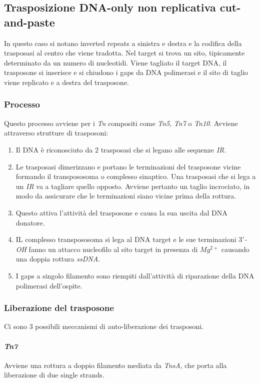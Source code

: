	\subsection{Trasposizione DNA-only non replicativa cut-and-paste}
	In questo caso si notano inverted repeats a sinistra e destra e la codifica della trasposasi al centro che viene tradotta.
	Nel target si trova un sito, tipicamente determinato da un numero di nucleotidi. 
	Viene tagliato il target DNA, il trasposone si inserisce e si chiudono i gaps da DNA polimerasi e il sito di taglio viene replicato e a destra del trasposone.
		
		\subsubsection{Processo}
		Questo processo avviene per i \emph{Tn} compositi come \emph{Tn5}, \emph{Tn7} o \emph{Tn10}.
		Avviene attraverso strutture di trasposoni:
		\begin{enumerate}
			\item Il DNA \`e riconosciuto da $2$ trasposasi che si legano alle sequenze \emph{IR}.
			\item Le trasposasi dimerizzano e portano le terminazioni del trasposone vicine formando il transpososoma o complesso sinaptico.
				Una trasposasi che si lega a un \emph{IR} va a tagliare quello opposto.
				Avviene pertanto un taglio incrociato, in modo da assicurare che le terminazioni siano vicine prima della rottura.
			\item Questo attiva l'attivit\`a del trasposone e causa la sua uscita dal DNA donatore.
			\item IL complesso transpososoma si lega al DNA target e le sue terminazioni \emph{$3'$-OH} fanno un attacco nucleofilo al sito target in presenza di \emph{$Mg^{2+}$} causando una doppia rottura \emph{ssDNA}.
			\item I gaps a singolo filamento sono riempiti dall'attivit\`a di riparazione della DNA polimerasi dell'ospite.
		\end{enumerate}

		\subsubsection{Liberazione del trasposone}
		Ci sono $3$ possibili meccanismi di auto-liberazione dei trasposoni.

			\paragraph{\emph{Tn7}}
			Avviene una rottura a doppio filamento mediata da \emph{TnsA}, che porta alla liberazione di due single strands.

